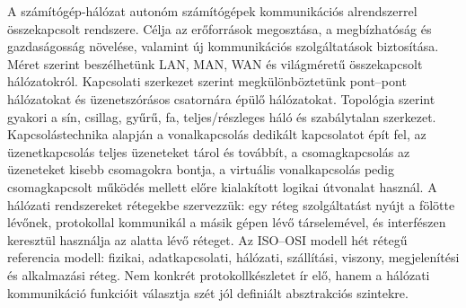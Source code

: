 \begin{summarybox}
A számítógép-hálózat autonóm számítógépek kommunikációs alrendszerrel összekapcsolt rendszere. Célja az erőforrások megosztása, a megbízhatóság és gazdaságosság növelése, valamint új kommunikációs szolgáltatások biztosítása. Méret szerint beszélhetünk LAN, MAN, WAN és világméretű összekapcsolt hálózatokról. Kapcsolati szerkezet szerint megkülönböztetünk pont--pont hálózatokat és üzenetszórásos csatornára épülő hálózatokat. Topológia szerint gyakori a sín, csillag, gyűrű, fa, teljes/részleges háló és szabálytalan szerkezet. Kapcsolástechnika alapján a vonalkapcsolás dedikált kapcsolatot épít fel, az üzenetkapcsolás teljes üzeneteket tárol és továbbít, a csomagkapcsolás az üzeneteket kisebb csomagokra bontja, a virtuális vonalkapcsolás pedig csomagkapcsolt működés mellett előre kialakított logikai útvonalat használ. A hálózati rendszereket rétegekbe szervezzük: egy réteg szolgáltatást nyújt a fölötte lévőnek, protokollal kommunikál a másik gépen lévő társelemével, és interfészen keresztül használja az alatta lévő réteget. Az ISO--OSI modell hét rétegű referencia modell: fizikai, adatkapcsolati, hálózati, szállítási, viszony, megjelenítési és alkalmazási réteg. Nem konkrét protokollkészletet ír elő, hanem a hálózati kommunikáció funkcióit választja szét jól definiált absztrakciós szintekre.
\end{summarybox}
